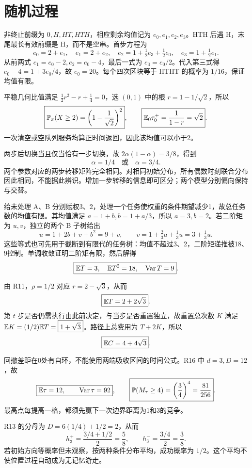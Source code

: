 \section{随机过程}

非终止前缀为 $0,H,HT,HTH$，相应剩余均值记为 $e_0,e_1,e_2,e_3$。HTH 后遇 H，末尾最长有效前缀是 H，而不是空串。首步方程为
\[
 e_0=2+e_1,\quad e_1=2+e_2,\quad
 e_2=1+\tfrac12e_3+\tfrac12e_0,\quad
 e_3=1+\tfrac12e_1.
\]
从前两式 $e_1=e_0-2,e_2=e_0-4$，最后一式为 $e_3=e_0/2$。代入第三式得 $e_0-4=1+3e_0/4$，故 $\boxed{e_0=20}$。每个四次区块等于 HTHT 的概率为 $1/16$，保证均值有限。

平稳几何比值满足 $\tfrac12r^2-r+\tfrac14=0$，选 $(0,1)$ 中的根 $r=1-1/\sqrt2$，所以
\[
 \boxed{\mathbb{P}_\pi(X\ge2)=\left(1-\frac1{\sqrt2}\right)^2},\qquad
 \boxed{\mathbb{E}_0\tau_0^+=\frac1{1-r}=\sqrt2}.
\]
一次清空或空队列服务均算正时间返回，因此该均值可以小于2。

两步后切换当且仅当恰有一步切换，故 $2\alpha(1-\alpha)=3/8$，得到
\[
 \boxed{\alpha=1/4\quad\text{或}\quad\alpha=3/4}.
\]
两个参数对应的两步转移矩阵完全相同。对相同初始分布，所有偶数时刻联合分布因此相同，不能据此辨识。增加一步转移的信息即可区分；两个模型分别偏向保持与交替。

给未处理 A、B 分别赋权3、2，处理一个任务使权重的条件期望减少1，故总任务数的均值有限。其均值满足 $a=1+b,b=1+a/3$，所以 $a=3,b=2$。若二阶矩为 $u,v$，独立的两个 B 子树给出
\[
 u=1+2b+v+b^2=9+v,\qquad
 v=1+\tfrac23a+\tfrac13u=3+\tfrac13u.
\]
这些等式也可先用于截断到有限代的任务树：均值不超过3、2，二阶矩递推被18、9控制。单调收敛证明二阶矩有限，然后解得
\[
 \boxed{\mathbb{E} T=3,\quad\mathbb{E} T^2=18,\quad\operatorname{Var} T=9}.
\]

由 R11，$\rho=1/2$ 对应 $r=2-\sqrt3$，从而
\[
 \boxed{\mathbb{E} T=2+2\sqrt3}.
\]
第 $t$ 步是否仍需执行由此前决定，与当步是否重置独立，故重置总次数 $K$ 满足 $\mathbb{E} K=(1/2)\mathbb{E} T=\boxed{1+\sqrt3}$。路径上总费用为 $T+2K$，所以
\[
 \boxed{\mathbb{E} C=4+4\sqrt3}.
\]

回撤差距在0处有自环，不能使用两端吸收区间的时间公式。R16 中 $d=3,D=12$，故
\[
 \boxed{\mathbb{E}\tau=12,\qquad\operatorname{Var}\tau=92},\qquad
 \boxed{\mathbb{P}(M_\tau\ge4)=\left(\frac34\right)^4=\frac{81}{256}}.
\]
最高点每提高一格，都须先赢下一次边界距离为1和3的竞争。

R13 的分母为 $D=6(1/4)+1/2=2$，从而
\[
 \boxed{h_3^+=\frac{3/4+1/2}{2}=\frac58},\qquad
 \boxed{h_3^-=\frac{3/4}{2}=\frac38}.
\]
若初始方向等概率但未观察，按两种条件分布平均，成功概率为 $\boxed{1/2}$。这个平均不使位置过程自动成为无记忆游走。

